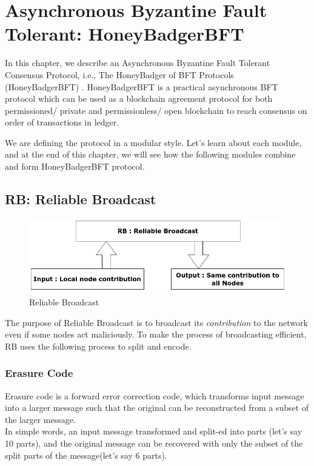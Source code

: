 \chapter{Asynchronous Byzantine Fault Tolerant: HoneyBadgerBFT}
\label{ch:hbbft}
In this chapter, we describe an Asynchronous Byzantine Fault Tolerant Consensus Protocol, i.e., The HoneyBadger of BFT Protocols (HoneyBadgerBFT) \cite{miller2016honey}. HoneyBadgerBFT is a practical asynchronous BFT protocol which can be used as a blockchain agreement protocol for both permissioned/ private and permissionless/ open blockchain to reach consensus on order of transactions in ledger.



We are defining the protocol in a modular style. Let's learn about each module, and at the end of this chapter, we will see how the following modules combine and form HoneyBadgerBFT protocol.
\section{RB: Reliable Broadcast}
\begin{figure}[!h]
    \centering
    \includegraphics[scale=0.5]{images/RB.png}
    \caption{Reliable Broadcast\cite{POANetwork}}
    \label{fig:rb}
\end{figure}
The purpose of Reliable Broadcast\cite{POANetwork} \cite{bracha1987asynchronous} \cite{cachin2005asynchronous} is to broadcast its \textit{contribution} to the network even if some nodes act maliciously. To make the process of broadcasting efficient, RB uses the following process to split and encode.
\subsection{Erasure Code}
Erasure code\cite{Erasure_code} is a forward error correction code, which transforms input message into a larger message such that the original can be reconstructed from a subset of the larger message.\\
In simple words, an input message transformed and split-ed into parts (let's say 10 parts), and the original message can be recovered with only the subset of the split parts of the message(let's say 6 parts).
